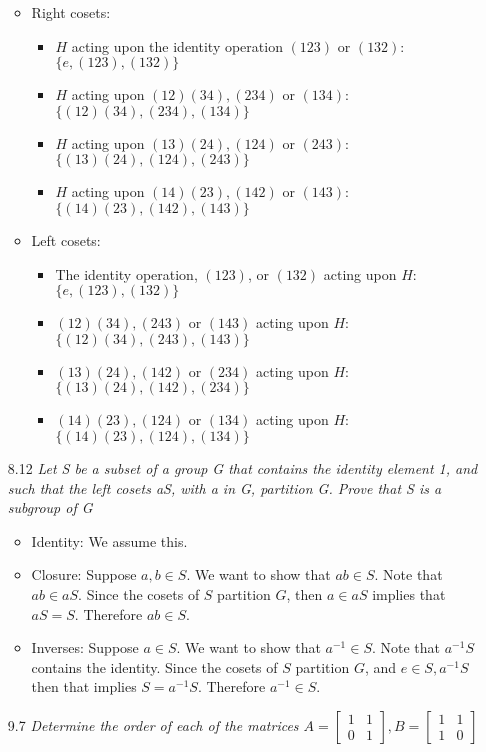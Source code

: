 \documentclass[12pt, letterpaper]{article}
\begin{document}
\begin{enumerate}
\begin{itemize}
			\item Right cosets:
			\begin{itemize}
				\item $H$ acting upon the identity operation $(123)$ or $(132)$: $\{e, (123),(132)\}$
				\item $H$ acting upon $(12)(34), (234)$ or $(134)$: $\{(12)(34), (234),(134)\}$
				\item $H$ acting upon $(13)(24), (124)$ or $(243)$: $\{(13)(24), (124),(243)\}$
				\item $H$ acting upon $(14)(23), (142)$ or $(143)$: $\{(14)(23), (142),(143)\}$
			\end{itemize}
			\item Left cosets:
			\begin{itemize}
				\item The identity operation, $(123)$, or $(132)$ acting upon $H$: $\{e, (123),(132)\}$
				\item $(12)(34),(243)$ or $(143)$ acting upon $H$: $\{(12)(34),(243), (143)\}$
				\item $(13)(24), (142)$ or $(234)$ acting upon $H$: $\{(13)(24), (142), (234)\}$
				\item $(14)(23), (124)$ or $(134)$ acting upon $H$: $\{(14)(23), (124), (134)\}$
			\end{itemize}
		\end{itemize}
	\item[8.12]\textit{Let S be a subset of a group G that contains the identity element 1, and such that the left
cosets aS, with a in G, partition G. Prove that S is a subgroup of G}\\
		\begin{itemize}
			\item Identity:  We assume this.  
			\item Closure:  Suppose $a,b \in S$.  We want to show that
			$ab \in S$.  Note that $ab \in aS$.  Since the 
			cosets of $S$ partition $G$, then $a \in aS$ implies that 
			$aS = S$.   Therefore $ab \in S$.  
			\item Inverses: Suppose $a \in S$.  We want to show that 
			$a^{-1} \in S$.  Note that $a^{-1}S$ contains the identity.  
			Since the cosets of $S$ partition $G$, and $e \in S, a^{-1}S$ then that implies $S = a^{-1}S$.  Therefore $a^{-1} \in S$.  
		\end{itemize}
	\item[9.7]\textit{Determine the order of each of the matrices $A =\begin{bmatrix}1 & 1\\ 0 & 1\end{bmatrix},  B = \begin{bmatrix}1 & 1\\ 1 & 0\end{bmatrix}$ }\\

\end{enumerate}
\end{document}
